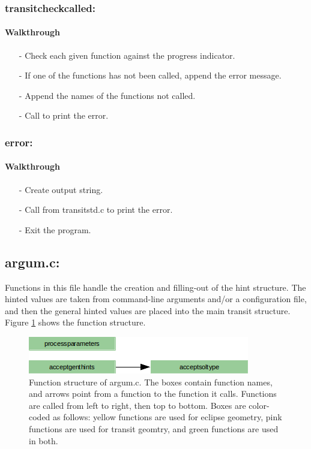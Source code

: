 \documentclass[letterpaper,12pt]{article}
\begin{document}
\subsubsection{transitcheckcalled:}
\paragraph{Walkthrough}
\begin{enumerate}[leftmargin=10pt, noitemsep, parsep=0pt, topsep=0ex]
\item[-] Check each given function against the progress indicator.
\item[-] If one of the functions has not been called, append the error message.
\item[-] Append the names of the functions not called.
\item[-] Call  to print the error.
\end{enumerate}

\subsubsection{error:}
\paragraph{Walkthrough}
\begin{enumerate}[leftmargin=10pt, noitemsep, parsep=0pt, topsep=0ex]
\item[-] Create output string.
\item[-] Call  from transitstd.c to print the error.
\item[-] Exit the program.
\end{enumerate}

\subsection{argum.c:} 
Functions in this file handle the creation and filling-out of the hint structure. The hinted values are taken from command-line arguments and/or a configuration file, and then the general hinted values are placed into the main transit structure. Figure \ref{fig:argumc} shows the function structure.

\begin{figure}
\includegraphics{fig/argumc}
\caption{Function structure of argum.c. The boxes contain function names, and arrows point from a function to the function it calls. Functions are called from left to right, then top to bottom.  Boxes are color-coded as follows:  yellow functions are used for eclipse geometry, pink functions are used for transit geomtry, and green functions are used in both.}
\label{fig:argumc}
\end{figure}
\end{document}
